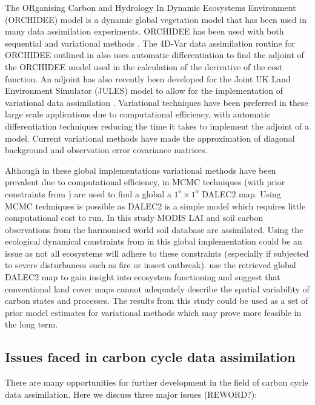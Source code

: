 \documentclass[12pt]{article}
\begin{document}
The ORganising Carbon and Hydrology In Dynamic Ecosystems Environment (ORCHIDEE) model \citep{Krinner2005} is a dynamic global vegetation model that has been used in many data assimilation experiments. ORCHIDEE has been used with both sequential \citep{Demarty2007} and variational methods \citep{Bacour2015}. The 4D-Var data assimilation routine for ORCHIDEE outlined in \citet{Kuppel2012} also uses automatic differentiation to find the adjoint of the ORCHIDEE model used in the calculation of the derivative of the cost function. An adjoint has also recently been developed for the Joint UK Land Environment Simulator (JULES) model to allow for the implementation of variational data assimilation \citep{raoult2016land}. Variational techniques have been preferred in these large scale applications due to computational efficiency, with automatic differentiation techniques reducing the time it takes to implement the adjoint of a model. Current variational methods have made the approximation of diagonal background and observation error covariance matrices.   

Although in these global implementations variational methods have been prevalent due to computational efficiency, in \citet{bloom2016decadal} MCMC techniques (with prior constraints from \citet{Bloom2015}) are used to find a global a \(1^\text{o} \times 1^\text{o}\) DALEC2 map. Using MCMC techniques is possible as DALEC2 is a simple model which requires little computational cost to run. In this study MODIS LAI and soil carbon observations from the harmonised world soil database are assimilated. Using the ecological dynamical constraints from \citet{Bloom2015} in this global implementation could be an issue as not all ecosystems will adhere to these constraints (especially if subjected to severe disturbances such as fire or insect outbreak). \citet{bloom2016decadal} use the retrieved global DALEC2 map to gain insight into ecosystem functioning and suggest that conventional land cover maps cannot adequately describe the spatial variability of carbon states and processes. The results from this study could be used as a set of prior model estimates for variational methods which may prove more feasible in the long term. 

\subsection{Issues faced in carbon cycle data assimilation}

There are many opportunities for further development in the field of carbon cycle data assimilation. Here we discuss three major issues (REWORD?):
\end{document}
